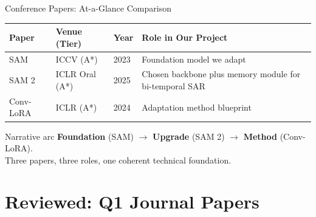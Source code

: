 \documentclass[10pt,aspectratio=169]{beamer}
\begin{document}
\begin{frame}{Conference Papers: At-a-Glance Comparison}
\renewcommand{\arraystretch}{1.4}
\begin{tabularx}{\textwidth}{p{2.4cm} p{2.6cm} p{2.4cm} X}
\toprule
\textbf{Paper} & \textbf{Venue (Tier)} & \textbf{Year} & \textbf{Role in Our Project} \\
\midrule
SAM \cite{Kirillov2023SAM} & ICCV (A*) & 2023 & Foundation model we adapt \\
SAM 2 \cite{Ravi2025SAM2} & ICLR Oral (A*) & 2025 & Chosen backbone plus memory module for bi-temporal SAR \\
Conv-LoRA \cite{Zhong2024ConvLoRA} & ICLR (A*) & 2024 & Adaptation method blueprint \\
\bottomrule
\end{tabularx}

\vspace{1em}
\begin{exampleblock}{Narrative arc}
\textbf{Foundation} (SAM) $\rightarrow$ \textbf{Upgrade} (SAM 2) $\rightarrow$ \textbf{Method} (Conv-LoRA). \\ Three papers, three roles, one coherent technical foundation.
\end{exampleblock}
\end{frame}

\section{Reviewed: Q1 Journal Papers}
\end{document}
